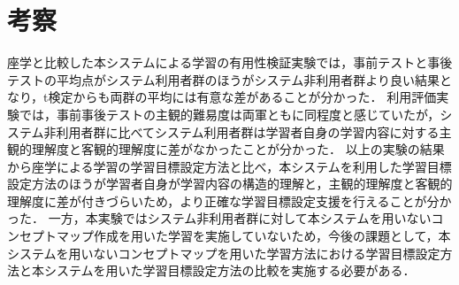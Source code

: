 \section{考察}
座学と比較した本システムによる学習の有用性検証実験では，事前テストと事後テストの平均点がシステム利用者群のほうがシステム非利用者群より良い結果となり，t検定からも両群の平均には有意な差があることが分かった．
利用評価実験では，事前事後テストの主観的難易度は両軍ともに同程度と感じていたが，システム非利用者群に比べてシステム利用者群は学習者自身の学習内容に対する主観的理解度と客観的理解度に差がなかったことが分かった．
以上の実験の結果から座学による学習の学習目標設定方法と比べ，本システムを利用した学習目標設定方法のほうが学習者自身が学習内容の構造的理解と，主観的理解度と客観的理解度に差が付きづらいため，より正確な学習目標設定支援を行えることが分かった．
一方，本実験ではシステム非利用者群に対して本システムを用いないコンセプトマップ作成を用いた学習を実施していないため，今後の課題として，本システムを用いないコンセプトマップを用いた学習方法における学習目標設定方法と本システムを用いた学習目標設定方法の比較を実施する必要がある．